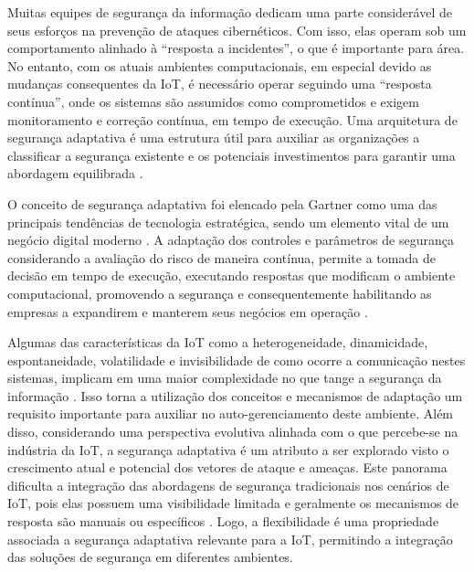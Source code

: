 \documentclass[tid,table]{texufpel} %
\begin{document}
Muitas equipes de segurança da informação dedicam uma parte considerável de seus esforços na prevenção de ataques cibernéticos. Com isso, elas operam sob um comportamento alinhado à ``resposta a incidentes'', o que é importante para área. No entanto, com os atuais ambientes computacionais, em especial devido as mudanças consequentes da IoT, é necessário operar seguindo uma ``resposta contínua'', onde os sistemas são assumidos como comprometidos e exigem monitoramento e correção contínua, em tempo de execução. Uma arquitetura de segurança adaptativa é uma estrutura útil para auxiliar as organizações a classificar a segurança existente e os potenciais investimentos para garantir uma abordagem equilibrada \cite{gartneradaptsec17}. 

O conceito de segurança adaptativa foi elencado pela Gartner como uma das principais tendências de tecnologia estratégica, sendo um elemento vital de um negócio digital moderno \cite{gartnerttrends17}. A adaptação dos controles e parâmetros de segurança considerando a avaliação do risco de maneira contínua, permite a tomada de decisão em tempo de execução, executando respostas que modificam o ambiente computacional, promovendo a segurança e consequentemente habilitando as empresas a expandirem e manterem seus negócios em operação \cite{gartnerttrends18}.

Algumas das características da IoT como a heterogeneidade, dinamicidade, espontaneidade, volatilidade e invisibilidade de como ocorre a comunicação nestes sistemas, implicam em uma maior complexidade no que tange a segurança da informação \cite{langheinrich10}. Isso torna a utilização dos conceitos e mecanismos de adaptação um requisito importante para auxiliar no auto-gerenciamento deste ambiente. Além disso, considerando uma perspectiva evolutiva alinhada com o que percebe-se na indústria da IoT, a segurança adaptativa é um atributo a ser explorado visto o crescimento atual e potencial dos vetores de ataque e ameaças. Este panorama dificulta a integração das abordagens de segurança tradicionais nos cenários de IoT, pois elas possuem uma visibilidade limitada e geralmente os mecanismos de resposta são manuais ou específicos \cite{yang12, zhao13, alaba17}. Logo, a flexibilidade é uma propriedade associada a segurança adaptativa relevante para a IoT, permitindo a integração das soluções de segurança em diferentes ambientes.
  
\end{document}
